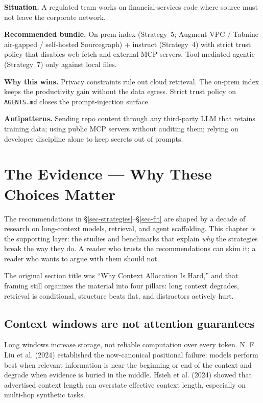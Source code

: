 \documentclass[
  11pt,
  letterpaper,
  numbers=noendperiod,
  parskip=half]{scrartcl}
\begin{document}
\textbf{Situation.} A regulated team works on financial-services code
where source must not leave the corporate network.

\textbf{Recommended bundle.} On-prem index (Strategy~5; Augment VPC /
Tabnine air-gapped / self-hosted Sourcegraph) + instruct (Strategy~4)
with strict trust policy that disables web fetch and external MCP
servers. Tool-mediated agentic (Strategy~7) only against local files.

\textbf{Why this wins.} Privacy constraints rule out cloud retrieval.
The on-prem index keeps the productivity gain without the data egress.
Strict trust policy on \texttt{AGENTS.md} closes the prompt-injection
surface.

\textbf{Antipatterns.} Sending repo content through any third-party
LLM that retains training data; using public MCP servers without
auditing them; relying on developer discipline alone to keep secrets
out of prompts.

\section{The Evidence --- Why These Choices Matter}\label{sec-evidence}

The recommendations in \S\ref{sec-strategies}--\S\ref{sec-fit} are
shaped by a decade of research on long-context models, retrieval, and
agent scaffolding. This chapter is the supporting layer: the studies
and benchmarks that explain \emph{why} the strategies break the way
they do. A reader who trusts the recommendations can skim it; a reader
who wants to argue with them should not.

The original section title was ``Why Context Allocation Is Hard,'' and
that framing still organizes the material into four pillars: long
context degrades, retrieval is conditional, structure beats flat, and
distractors actively hurt.

\subsection{Context windows are not attention
guarantees}\label{sec-attention}

Long windows increase storage, not reliable computation over every
token. N. F. Liu et al. (2024) established the now-canonical positional
failure: models perform best when relevant information is near the
beginning or end of the context and degrade when evidence is buried in
the middle. {Hsieh et al.} (2024) showed that advertised context length
can overstate effective context length, especially on multi-hop
synthetic tasks.
\end{document}
